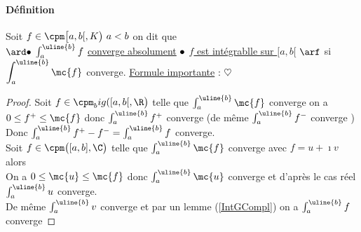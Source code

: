 		\paragraph{Définition} 
			Soit $f\in\cpm\big[a,b[,K\big) ~a<b$ on dit que \\ \hspace*{2cm} $\ard \bullet$ $\int_a^{\uline{b}} f $ \underline{converge absolument} 
			$ \\ \bullet $ \underline{$f$ est intégrablle sur $[a,b[$} $\arf$\hspace*{0.5cm} si $\displaystyle{\int_a^{\uline{b}}\mc{f}}$ converge. 
			\vspace*{0.2cm}\trait
		\underline{Formule importante} :  $\heartsuit$
		\vspace*{0.3cm}\\ 
		\begin{proof}
		 Soit $f\in\cpm_big([a,b[,\R\big)$ telle que $\int_a^{\uline{b}} \mc{f}$ converge on a \\ $0\leq f^+\leq\mc{f}$ donc 
		$\int_a^{\uline{b}} f^+$ converge \big(de même $\int_a^{\uline{b}} f^-$ converge \big) \\ 
		Donc $\int_a^{\uline{b}} f^+ - f^- = \int_a^{\uline{b}} f$ converge.\\
		 Soit $f\in\cpm\big([a,b],\C\big)$ telle que $\int_a^{\uline{b}} \mc{f}$ converge avec $f=u+\imath v$ alors
		\\ On a $0\leq\mc{u}\leq\mc{f}$ donc $\int_a^{\uline{b}} \mc{u}$ converge et d'après le cas réel $\int_a^{\uline{b}} u$ converge.\\
		De même $\int_a^{\uline{b}} v$ converge et par un lemme (\ref{IntGCompl}) on a $\int_a^{\uline{b}} f$ converge
		\end{proof}
